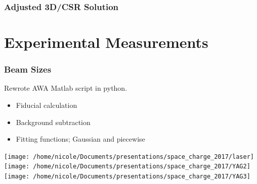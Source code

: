 \documentclass[professionalfonts,t]{beamer}
\newcommand{\secimage}{../../tex/images/awa_gun}
\begin{document}
\begin{frame}
	\frametitle{Adjusted 3D/CSR Solution}
\end{frame}
{
	\renewcommand{\secimage}{../../tex/images/YAG_screen}
\section{Experimental Measurements}
\begin{frame}
\frametitle{Beam Sizes}
Rewrote AWA Matlab script in python.
\begin{itemize}
	\item Fiducial calculation
	\item Background subtraction 
	\item Fitting functions; Gaussian and piecewise
\end{itemize}	

\vspace{1em}
\centering
\texttt{[image: /home/nicole/Documents/presentations/space\_charge\_2017/laser]}%
\texttt{[image: /home/nicole/Documents/presentations/space\_charge\_2017/YAG2]}%
\texttt{[image: /home/nicole/Documents/presentations/space\_charge\_2017/YAG3]}
\end{frame}

}
\end{document}
